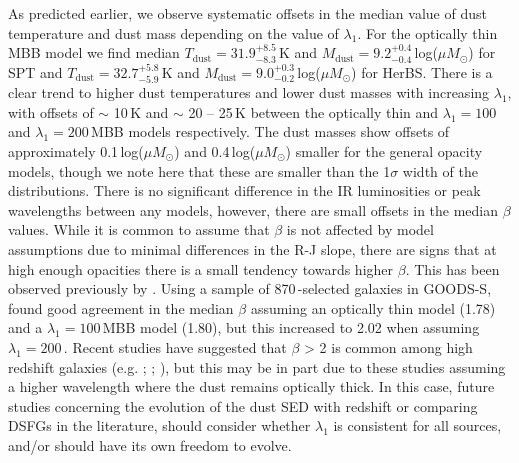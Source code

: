 As predicted earlier, we observe systematic offsets in the median value of dust temperature and dust mass depending on the value of $\lambda_1$. For the optically thin MBB model we find median $T_{\textrm{dust}} = 31.9_{-8.3}^{+8.5}$\,K and $M_{\textrm{dust}} = 9.2_{-0.4}^{+0.4}$\,log($\mu M_\odot$) for SPT and $T_{\textrm{dust}} = 32.7_{-5.9}^{+5.8}$\,K and $M_{\textrm{dust}} = 9.0_{-0.2}^{+0.3}$\,log($\mu M_\odot$) for HerBS. There is a clear trend to higher dust temperatures and lower dust masses with increasing $\lambda_1$, with offsets of $\sim$ 10\,K and $\sim$ 20 -- 25\,K between the optically thin and $\lambda_1 = 100$\,\micron and $\lambda_1 = 200$\,\micron MBB models respectively. The dust masses show offsets of approximately 0.1\,log($\mu M_\odot$) and 0.4\,log($\mu M_\odot$) smaller for the general opacity models, though we note here that these are smaller than the 1$\sigma$ width of the distributions. There is no significant difference in the IR luminosities or peak wavelengths between any models, however, there are small offsets in the median $\beta$ values. While it is common to assume that $\beta$ is not affected by model assumptions due to minimal differences in the R-J slope, there are signs that at high enough opacities there is a small tendency towards higher $\beta$. This has been observed previously by \citealt{McKay_2023}. Using a sample of 870\,\micron-selected galaxies in GOODS-S, \citealt{McKay_2023} found good agreement in the median $\beta$ assuming an optically thin model (1.78) and a $\lambda_1 = 100$\,\micron MBB model (1.80), but this increased to 2.02 when assuming $\lambda_1 = 200$\,\micron. Recent studies have suggested that $\beta$ > 2 is common among high redshift galaxies (e.g. \citealt{Casey_2019}; \citealt{Casey_2021}; \citealt{Cooper_2022}), but this may be in part due to these studies assuming a higher wavelength where the dust remains optically thick. In this case, future studies concerning the evolution of the dust SED with redshift or comparing DSFGs in the literature, should consider whether $\lambda_1$ is consistent for all sources, and/or should have its own freedom to evolve.

